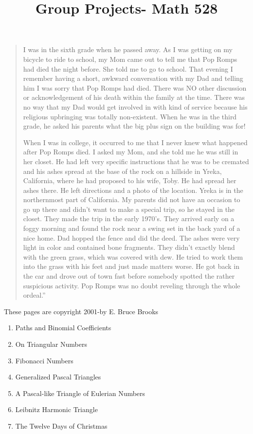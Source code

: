 \begin{quote}
I was in the sixth grade when he passed away. As I was getting on my
bicycle to ride to school, my Mom came out to tell me that Pop Romps had
died the night before. She told me to go to school. That evening I
remember having a short, awkward conversation with my Dad and telling
him I was sorry that Pop Romps had died. There was NO other discussion
or acknowledgement of his death within the family at the time. There was
no way that my Dad would get involved in with kind of service because
his religious upbringing was totally non-existent. When he was in the
third grade, he asked his parents what the big plus sign on the building
was for!

When I was in college, it occurred to me that I never knew what happened
after Pop Romps died. I asked my Mom, and she told me he was still in
her closet. He had left very specific instructions that he was to be
cremated and his ashes spread at the base of the rock on a hillside in
Yreka, California, where he had proposed to his wife, Toby. He had
spread her ashes there. He left directions and a photo of the location.
Yreka is in the northernmost part of California. My parents did not have
an occasion to go up there and didn't want to make a special trip, so he
stayed in the closet. They made the trip in the early 1970's. They
arrived early on a foggy morning and found the rock near a swing set in
the back yard of a nice home. Dad hopped the fence and did the deed. The
ashes were very light in color and contained bone fragments. They didn't
exactly blend with the green grass, which was covered with dew. He tried
to work them into the grass with his feet and just made matters worse.
He got back in the car and drove out of town fast before somebody
spotted the rather suspicious activity. Pop Romps was no doubt reveling
through the whole ordeal.''

\end{quote}

These pages are copyright 2001-by E. Bruce Brooks

\title{Group Projects- Math 528}
\begin{enumerate}
\def\labelenumi{\arabic{enumi}.}

\item
  Paths and Binomial Coefficients
\item
  On Triangular Numbers
\item
  Fibonacci Numbers
\item
  Generalized Pascal Triangles
\item
  A Pascal-like Triangle of Eulerian Numbers
\item
  Leibnitz Harmonic Triangle
\item
  The Twelve Days of Christmas

\end{enumerate}

